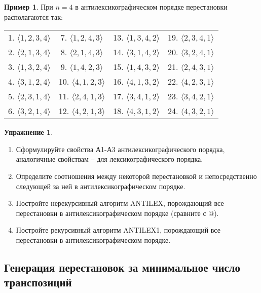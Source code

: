 \documentclass[12pt,a4paper]{article}
\theoremstyle{plain}
\theoremstyle{definition}
\newtheorem*{task}{Упражнение}
\newtheorem*{example}{Пример}
\theoremstyle{remark}
\begin{document}
\begin{example}
При $n=4$ в антилексикографическом порядке перестановки располагаются так:

\begin{tabular}{cccc}
1. $\langle1, 2, 3, 4\rangle$ & 7. $\langle1, 2, 4, 3\rangle$ & 13. $\langle1, 3, 4, 2\rangle$ & 19. $\langle2, 3, 4, 1\rangle$ \\
2. $\langle2, 1, 3, 4\rangle$ & 8. $\langle2, 1, 4, 3\rangle$ & 14. $\langle3, 1, 4, 2\rangle$ & 20. $\langle3, 2, 4, 1\rangle$ \\
3. $\langle1, 3, 2, 4\rangle$ & 9. $\langle1, 4, 2, 3\rangle$ & 15. $\langle1, 4, 3, 2\rangle$ & 21. $\langle2, 4, 3, 1\rangle$ \\
4. $\langle3, 1, 2, 4\rangle$ & 10. $\langle4, 1, 2, 3\rangle$ & 16. $\langle4, 1, 3, 2\rangle$ & 22. $\langle4, 2, 3, 1\rangle$ \\
5. $\langle2, 3, 1, 4\rangle$ & 11. $\langle2, 4, 1, 3\rangle$ & 17. $\langle3, 4, 1, 2\rangle$ & 23. $\langle3, 4, 2, 1\rangle$ \\
6. $\langle3, 2, 1, 4\rangle$ & 12. $\langle4, 2, 1, 3\rangle$ & 18. $\langle4, 3, 1, 2\rangle$ &24. $\langle4, 3, 2 ,1\rangle$ \\
\end{tabular}
\end{example}

\begin{task}
\begin{enumerate}
\item Сформулируйте свойства А1-А3 антилексикографического порядка, аналогичные свойствам -- для лексикографического порядка.
\item Определите соотношения между некоторой перестановкой и непосредственно следующей за ней в антилексикографическом порядке.
\item Постройте нерекурсивный алгоритм ANTILEX, порождающий все перестановки в антилексикографическом порядке (сравните с \verb@[1]@).
\item Постройте рекурсивный алгоритм ANTILEX1, порождающий все перестановки в антилексикографическом порядке.
\end{enumerate}
\end{task}

\subsection{Генерация перестановок за минимальное число транспозиций}
\end{document}
